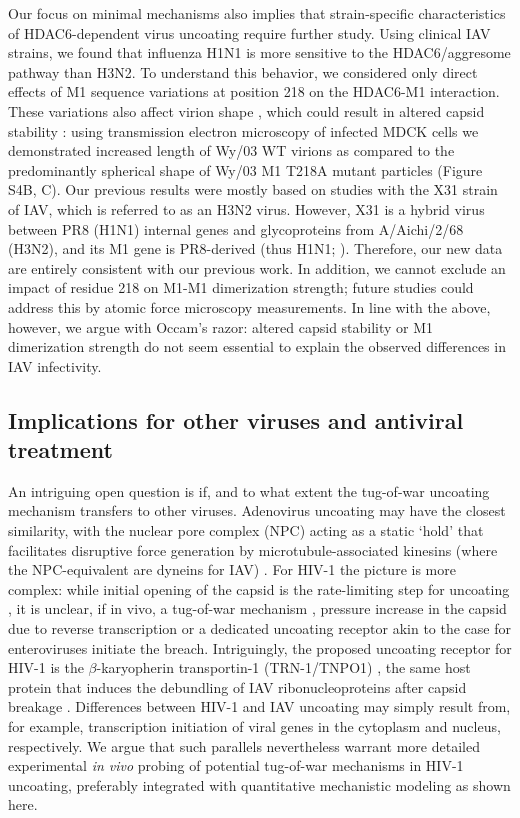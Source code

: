 Our focus on minimal mechanisms also implies that strain-specific characteristics of HDAC6-dependent virus uncoating require further study. Using clinical IAV strains, we found that influenza H1N1 is more sensitive to the HDAC6/aggresome pathway than H3N2. To understand this behavior, we considered only direct effects of M1 sequence variations at position 218 on the HDAC6-M1 interaction. These variations also affect virion shape \cite{elleman2004m1}, which could result in altered capsid stability \cite{dadonaite2016filamentous}: using transmission electron microscopy of infected MDCK cells we demonstrated increased length of Wy/03 WT virions as compared to the predominantly spherical shape of Wy/03 M1 T218A mutant particles (Figure S4B, C). Our previous results \cite{banerjee2014influenza} were mostly based on studies with the X31 strain of IAV, which is referred to as an H3N2 virus. However, X31 is a hybrid virus between PR8 (H1N1) internal genes and glycoproteins from A/Aichi/2/68  (H3N2), and its M1 gene is PR8-derived (thus H1N1; \cite{banerjee2013high}). Therefore, our new data are entirely consistent with our previous work. In addition, we cannot exclude an impact of residue 218 on M1-M1 dimerization strength; future studies could address this by atomic force microscopy measurements. In line with the above, however, we argue with Occam’s razor: altered capsid stability or M1 dimerization strength do not seem essential to explain the observed differences in IAV infectivity.

\subsection{Implications for other viruses and antiviral treatment}

An intriguing open question is if, and to what extent the tug-of-war uncoating mechanism transfers to other viruses. Adenovirus uncoating may have the closest similarity, with the nuclear pore complex (NPC) acting as a static ‘hold’ that facilitates disruptive force generation by microtubule-associated kinesins (where the NPC-equivalent are dyneins for IAV) \cite{flatt2019adenovirus,greber2019adenovirus}. For HIV-1 the picture is more complex: while initial opening of the capsid is the rate-limiting step for uncoating \cite{marquez2018kinetics}, it is unclear, if in vivo, a tug-of-war mechanism \cite{rawle2018toward}, pressure increase in the capsid due to reverse transcription \cite{rankovic2017reverse} or a dedicated uncoating receptor akin to the case for enteroviruses \cite{zhao2019human} initiate the breach. Intriguingly, the proposed uncoating receptor for HIV-1 is the $\beta$-karyopherin transportin-1 (TRN-1/TNPO1) \cite{fernandez2019transportin}, the same host protein that induces the debundling of IAV ribonucleoproteins after capsid breakage \cite{miyake2019influenza, yamauchi2020influenza}. Differences between HIV-1 and IAV uncoating may simply result from, for example, transcription initiation of viral genes in the cytoplasm and nucleus, respectively. We argue that such parallels nevertheless warrant more detailed experimental \textit{in vivo} probing of potential tug-of-war mechanisms in HIV-1 uncoating, preferably integrated with quantitative mechanistic modeling as shown here.

